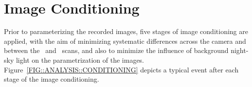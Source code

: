 \section{Image Conditioning}
\label{SEC::ANALYSIS::CONDITIONING}

Prior to parameterizing the recorded images, five stages of image
conditioning are applied, with the aim of minimizing systematic
differences across the camera and between the \On\ and \Off\ scans,
and also to minimize the influence of background night-sky light on
the parametrization of the
images. Figure~\ref{FIG::ANALYSIS::CONDITIONING} depicts a typical
event after each stage of the image conditioning.

\begin{figure}[p]
\centerline{}
\end{figure}
